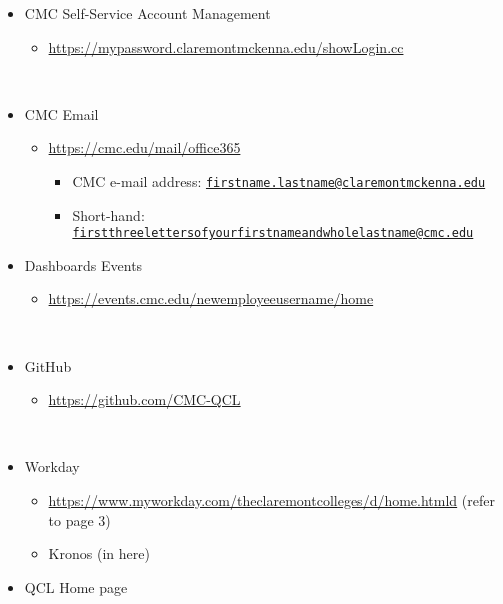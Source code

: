 \documentclass[
]{book}
\providecommand{\tightlist}{%
  \setlength{\itemsep}{0pt}\setlength{\parskip}{0pt}}
\begin{document}
\begin{itemize}
\tightlist
\item
  CMC Self-Service Account Management

  \begin{itemize}
  \tightlist
  \item
    \url{https://mypassword.claremontmckenna.edu/showLogin.cc}\strut \\
  \end{itemize}
\item
  CMC Email

  \begin{itemize}
  \tightlist
  \item
    \url{https://cmc.edu/mail/office365}

    \begin{itemize}
    \tightlist
    \item
      CMC e-mail address: \href{mailto:firstname.lastname@claremontmckenna.edu}{\nolinkurl{firstname.lastname@claremontmckenna.edu}}\\
    \item
      Short-hand: \href{mailto:firstthreelettersofyourfirstnameandwholelastname@cmc.edu}{\nolinkurl{firstthreelettersofyourfirstnameandwholelastname@cmc.edu}}\\
    \end{itemize}
  \end{itemize}
\item
  Dashboards Events

  \begin{itemize}
  \tightlist
  \item
    \url{https://events.cmc.edu/newemployeeusername/home}\strut \\
  \end{itemize}
\item
  GitHub

  \begin{itemize}
  \tightlist
  \item
    \url{https://github.com/CMC-QCL}\strut \\
  \end{itemize}
\item
  Workday

  \begin{itemize}
  \tightlist
  \item
    \url{https://www.myworkday.com/theclaremontcolleges/d/home.htmld} (refer to page 3)\\
  \item
    Kronos (in here)\\
  \end{itemize}
\item
  QCL Home page


\end{itemize}
\end{document}
